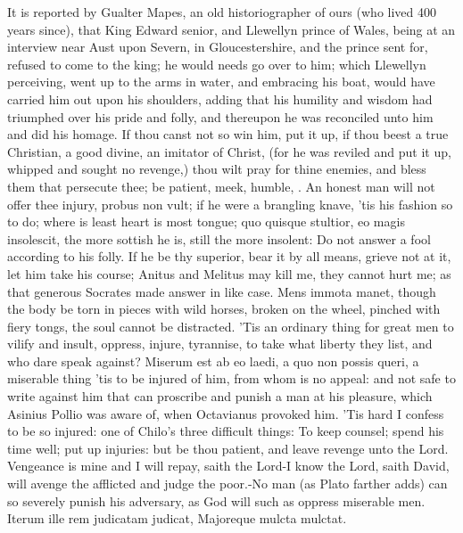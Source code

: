 {It is reported by Gualter Mapes, an old historiographer of ours
(who lived 400 years since), that King Edward senior, and Llewellyn
prince of Wales, being at an interview near Aust upon Severn, in
Gloucestershire, and the prince sent for, refused to come to the king;
he would needs go over to him; which Llewellyn perceiving, went
up to the arms in water, and embracing his boat, would have carried him
out upon his shoulders, adding that his humility and wisdom had
triumphed over his pride and folly, and thereupon he was reconciled
unto him and did his homage. If thou canst not so win him, put it up,
if thou beest a true Christian, a good divine, an imitator of Christ,
(for he was reviled and put it up, whipped and sought no
revenge,) thou wilt pray for thine enemies, and bless them that
persecute thee; be patient, meek, humble, \etc{}. An honest man will not
offer thee injury, probus non vult; if he were a brangling knave, 'tis
his fashion so to do; where is least heart is most tongue; quo quisque
stultior, eo magis insolescit, the more sottish he is, still the more
insolent: Do not answer a fool according to his folly. If he be
thy superior, bear it by all means, grieve not at it, let him
take his course; Anitus and Melitus may kill me, they cannot hurt
me; as that generous Socrates made answer in like case. Mens immota
manet, though the body be torn in pieces with wild horses, broken on
the wheel, pinched with fiery tongs, the soul cannot be distracted.
'Tis an ordinary thing for great men to vilify and insult, oppress,
injure, tyrannise, to take what liberty they list, and who dare speak
against? Miserum est ab eo laedi, a quo non possis queri, a miserable
thing 'tis to be injured of him, from whom is no appeal: and not
safe to write against him that can proscribe and punish a man at his
pleasure, which Asinius Pollio was aware of, when Octavianus provoked
him. 'Tis hard I confess to be so injured: one of Chilo's three
difficult things: To keep counsel; spend his time well; put up
injuries: but be thou patient, and leave revenge unto the Lord.
Vengeance is mine and I will repay, saith the Lord-I know the
Lord, saith David, will avenge the afflicted and judge the
poor.-No man (as Plato farther adds) can so severely punish his
adversary, as God will such as oppress miserable men.
Iterum ille rem judicatam judicat,
Majoreque mulcta mulctat.

}
